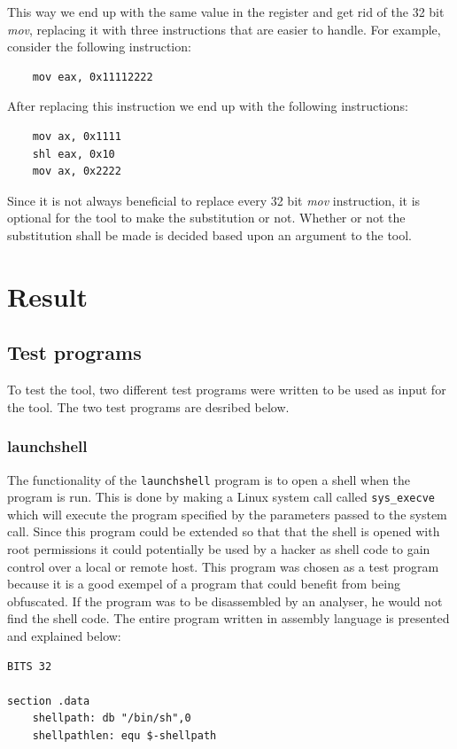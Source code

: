 \documentclass[11pt,twoside]{eitExjobb}
\begin{document}
\noindent This way we end up with the same value in the register and get rid of the 32 bit \emph{mov}, replacing it with three instructions that are easier to handle. For example, consider the following instruction:
\begin{verbatim}
    mov eax, 0x11112222
\end{verbatim}

\noindent After replacing this instruction we end up with the following instructions:
\begin{verbatim}
    mov ax, 0x1111
    shl eax, 0x10
    mov ax, 0x2222
\end{verbatim} 

\noindent Since it is not always beneficial to replace every 32 bit \emph{mov} instruction, it is optional for the tool to make the substitution or not. Whether or not the substitution shall be made is decided based upon an argument to the tool.

\chapter{Result}
\section{Test programs}
To test the tool, two different test programs were written to be used as input for the tool. The two test programs are desribed below.

\subsection{launchshell}
The functionality of the \texttt{launchshell} program is to open a shell when the program is run. This is done by making a Linux system call called \texttt{sys\_execve} which will execute the program specified by the parameters passed to the system call. Since this program could be extended so that that the shell is opened with root permissions it could potentially be used by a hacker as shell code to gain control over a local or remote host. This program was chosen as a test program because it is a good exempel of a program that could benefit from being obfuscated. If the program was to be disassembled by an analyser, he would not find the shell code. The entire program written in assembly language is presented and explained below:

\begin{verbatim}
BITS 32

section .data
    shellpath: db "/bin/sh",0
    shellpathlen: equ $-shellpath
\end{verbatim}
\end{document}
